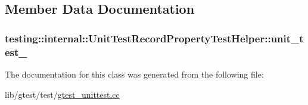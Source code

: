 \subsection{Member Data Documentation}
\hypertarget{classtesting_1_1internal_1_1_unit_test_record_property_test_helper_a415e13a354d3b8bd97db96aae5ef5df1}{
\subsubsection[{unit\-\_\-test\-\_\-}]{ testing\-::internal\-::\-Unit\-Test\-Record\-Property\-Test\-Helper\-::unit\-\_\-test\-\_\-\hspace{0.3cm}{\ttfamily [protected]}}}\label{classtesting_1_1internal_1_1_unit_test_record_property_test_helper_a415e13a354d3b8bd97db96aae5ef5df1}


The documentation for this class was generated from the following file\-:\begin{DoxyCompactItemize}
\item 
lib/gtest/test/\hyperlink{gtest__unittest_8cc}{gtest\-\_\-unittest.\-cc}\end{DoxyCompactItemize}
